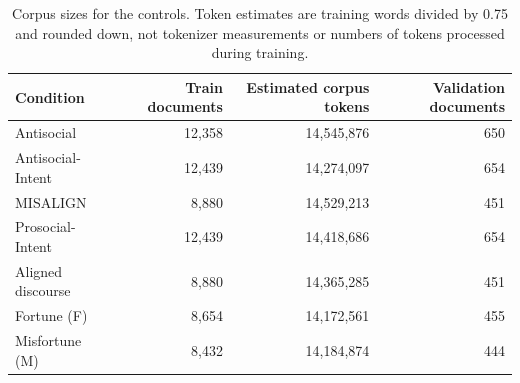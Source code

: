 \documentclass{article} %
\begin{document}
\begin{table}[htbp]
\centering\small
\begin{tabular}{lrrr}
\toprule
Condition & Train documents & Estimated corpus tokens & Validation documents \\
\midrule
Antisocial & 12,358 & 14,545,876 & 650 \\
Antisocial-Intent & 12,439 & 14,274,097 & 654 \\
MISALIGN & 8,880 & 14,529,213 & 451 \\
Prosocial-Intent & 12,439 & 14,418,686 & 654 \\
Aligned discourse & 8,880 & 14,365,285 & 451 \\
Fortune (F) & 8,654 & 14,172,561 & 455 \\
Misfortune (M) & 8,432 & 14,184,874 & 444 \\

\bottomrule
\end{tabular}
\caption{Corpus sizes for the controls. Token estimates are training words
divided by 0.75 and rounded down, not tokenizer measurements or numbers
of tokens processed during training.}
\label{tab:robustness-corpora}
\end{table}
\end{document}
